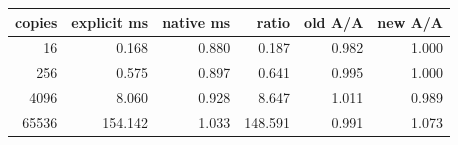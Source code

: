 \begin{center}
\begin{tabular}{rrrrrr}
\toprule
copies & explicit ms & native ms & ratio & old A/A & new A/A\\
\midrule
16 & 0.168 & 0.880 & 0.187 & 0.982 & 1.000\\
256 & 0.575 & 0.897 & 0.641 & 0.995 & 1.000\\
4096 & 8.060 & 0.928 & 8.647 & 1.011 & 0.989\\
65536 & 154.142 & 1.033 & 148.591 & 0.991 & 1.073\\
\bottomrule
\end{tabular}
\end{center}
